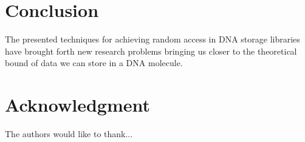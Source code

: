 \documentclass[a4paper,conference]{IEEEtran}
\begin{document}
\section{Conclusion}
The presented techniques for achieving random access in DNA storage libraries have brought forth new research problems bringing us closer to the theoretical bound of data we can store in a DNA molecule.





\section*{Acknowledgment}


The authors would like to thank...







%
%
%




\end{document}
